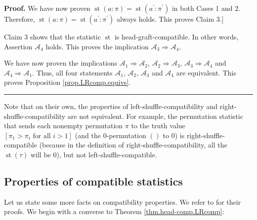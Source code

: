 \documentclass[numbers=enddot,12pt,final,onecolumn,notitlepage]{scrartcl}%
\theoremstyle{definition}
\newenvironment{proof}[1][Proof]{\noindent\textbf{#1.} }{\ \rule{0.5em}{0.5em}}
\newenvironment{verlong}{}{}
\newenvironment{vershort}{}{}
\begin{document}
\begin{verlong}
\begin{proof}
We have now proven $\operatorname*{st}\left(  a:\pi\right)
=\operatorname*{st}\left(  a^{\prime}:\pi^{\prime}\right)  $ in both Cases 1
and 2. Therefore, $\operatorname*{st}\left(  a:\pi\right)  =\operatorname*{st}%
\left(  a^{\prime}:\pi^{\prime}\right)  $ always holds. This proves Claim 3.]

Claim 3 shows that the statistic $\operatorname*{st}$ is
head-graft-compatible. In other words, Assertion $\mathcal{A}_{4}$ holds. This
proves the implication $\mathcal{A}_{3}\Longrightarrow\mathcal{A}_{4}$.

We have now proven the implications $\mathcal{A}_{1}\Longrightarrow
\mathcal{A}_{2}$, $\mathcal{A}_{2}\Longrightarrow\mathcal{A}_{3}$,
$\mathcal{A}_{3}\Longrightarrow\mathcal{A}_{4}$ and $\mathcal{A}%
_{4}\Longrightarrow\mathcal{A}_{1}$. Thus, all four statements $\mathcal{A}%
_{1}$, $\mathcal{A}_{2}$, $\mathcal{A}_{3}$ and $\mathcal{A}_{4}$ are
equivalent. This proves Proposition \ref{prop.LRcomp.equivs}.
\end{proof}
\end{verlong}

Note that on their own, the properties of left-shuffle-compatibility and
right-shuffle-compatibility are not equivalent. For example, the permutation
statistic that sends each nonempty permutation $\pi$ to the truth value
$\left[  \pi_{1}>\pi_{i}\text{ for all }i>1\right]  $ (and the $0$-permutation
$\left(  {}\right)  $ to $0$) is right-shuffle-compatible (because in the
definition of right-shuffle-compatibility, all the $\operatorname*{st}\left(
\tau\right)  $ will be $0$), but not left-shuffle-compatible.

\subsection{Properties of compatible statistics}

\begin{vershort}
Let us state some more facts on compatibility properties. We refer to
\cite{verlong} for their proofs. We begin with a converse to Theorem
\ref{thm.head-comp.LRcomp}:
\end{vershort}
\end{document}
